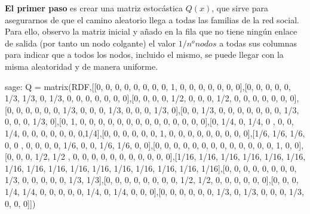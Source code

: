 \par \textbf{El primer paso} es crear una matriz estocástica $Q(x)$, que sirve para asegurarnos de que el camino
aleatorio llega a todas las familias de la red social. Para ello, observo la matriz inicial y añado en la fila
que no tiene ningún enlace de salida (por tanto un nodo colgante) el valor $1/n^o nodos$ a todas sus columnas para indicar que 
a todos los nodos, incluido el mismo, se puede llegar con la misma aleatoridad y de manera uniforme. 

\begin{sagecommandline}
    sage: Q = matrix(RDF,[[0, 0, 0, 0, 0, 0, 0, 0, 1, 0, 0, 0, 0, 0, 0, 0],[0, 0, 0, 0, 0, 1/3, 1/3, 0, 1/3, 0, 0, 0, 0, 0, 0, 0],[0, 0, 0, 0, 1/2, 0, 0, 0, 1/2, 0, 0, 0, 0, 0, 0, 0],[0, 0, 0, 0, 0, 0, 1/3, 0, 0, 0, 1/3, 0, 0, 0, 1/3, 0],[0, 0, 1/3, 0, 0, 0, 0, 0, 0, 0, 1/3, 0, 0, 0, 1/3, 0],[0, 1, 0, 0, 0, 0, 0, 0, 0, 0, 0, 0, 0, 0, 0, 0],[0, 1/4, 0, 1/4, 0 , 0, 0, 1/4, 0, 0, 0, 0, 0, 0, 0,1/4],[0, 0, 0, 0, 0, 0, 1, 0, 0, 0, 0, 0, 0, 0, 0, 0],[1/6, 1/6, 1/6, 0, 0 , 0, 0, 0, 0, 1/6, 0, 0, 1/6, 1/6, 0, 0],[0, 0, 0, 0, 0, 0, 0, 0, 0, 0, 0, 0, 0, 1, 0, 0],[0, 0, 0, 1/2, 1/2 , 0, 0, 0, 0, 0, 0, 0, 0, 0, 0, 0],[1/16, 1/16, 1/16, 1/16, 1/16, 1/16, 1/16, 1/16, 1/16, 1/16, 1/16, 1/16, 1/16, 1/16, 1/16, 1/16],[0, 0, 0, 0, 0, 0, 0, 0, 1/3, 0, 0, 0, 0, 0, 1/3, 1/3],[0, 0, 0, 0, 0, 0, 0, 0, 1/2, 1/2, 0, 0, 0, 0, 0, 0],[0, 0, 0, 1/4, 1/4, 0, 0, 0, 0, 0, 1/4, 0, 1/4, 0, 0, 0],[0, 0, 0, 0, 0, 0, 1/3, 0, 1/3, 0, 0, 0, 1/3, 0, 0, 0]])
\end{sagecommandline}

